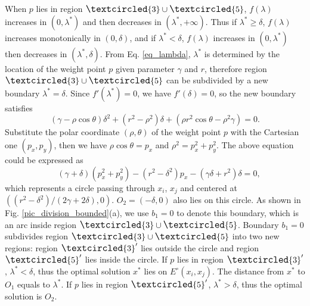 \documentclass[final,3p,times]{elsarticle}
\begin{document}
When $p$ lies in region $\large{\textcircled{\small{3}}}\cup\large{\textcircled{\small{5}}}$, $f(\lambda)$ increases in $(0,\lambda^*)$ and then decreases in $(\lambda^*,+\infty)$. Thus if $\lambda^*\geq\delta$, $f(\lambda)$ increases monotonically in $(0,\delta)$, and if $\lambda^*<\delta$, $f(\lambda)$ increases in $(0,\lambda^*)$ then decreases in $(\lambda^*,\delta)$. From Eq. \eqref{eq_lambda}, $\lambda^*$ is determined by the location of the weight point $p$ given parameter $\gamma$ and $r$, therefore region $\large{\textcircled{\small{3}}}\cup\large{\textcircled{\small{5}}}$ can be subdivided by a new boundary $\lambda^*=\delta$. Since $f'(\lambda^*)=0$, we have $f'(\delta)=0$, so the new boundary satisfies
\begin{equation*}
(\gamma-\rho\cos\theta)\delta^2+(r^2-\rho^2)\delta+(\rho r^2\cos\theta-\rho^2\gamma)=0.
\end{equation*}
Substitute the polar coordinate $(\rho,\theta)$ of the weight point $p$ with the Cartesian one $(p_x,p_y)$, then we have $\rho\cos\theta=p_x$ and $\rho^2=p_x^2+p_y^2$. The above equation could be expressed as
\begin{equation}
\label{eq_boundary1}
\quad (\gamma+\delta)(p_x^2+p_y^2) - (r^2-\delta^2)p_x - (\gamma\delta+r^2)\delta = 0,
\end{equation}
which represents a circle passing through $x_i$, $x_j$ and centered at $((r^2-\delta^2)/(2\gamma+2\delta),0)$. $O_2=(-\delta,0)$ also lies on this circle. As shown in Fig. \ref{pic_division_bounded}(a), we use $b_1=0$ to denote this boundary, which is an arc inside region $\large{\textcircled{\small{3}}}\cup\large{\textcircled{\small{5}}}$.  Boundary $b_1=0$ subdivides region $\large{\textcircled{\small{3}}}\cup\large{\textcircled{\small{5}}}$ into two new regions: region $\large{\textcircled{\small{3}}}'$ lies outside the circle and region $\large{\textcircled{\small{5}}}'$ lies inside the circle. If $p$ lies in region $\large{\textcircled{\small{3}}}'$, $\lambda^*<\delta$, thus the optimal solution $x^*$ lies on $E^\circ(x_i,x_j)$. The distance from $x^*$ to $O_1$ equals to $\lambda^*$. If $p$ lies in region $\large{\textcircled{\small{5}}}'$, $\lambda^*>\delta$, thus the optimal solution is $O_2$.
\end{document}
